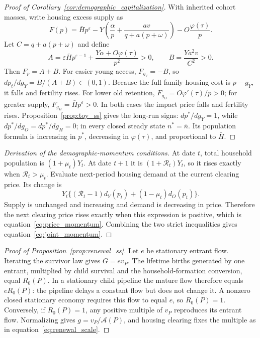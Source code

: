\documentclass[11pt]{article}
\theoremstyle{definition}
\newcommand{\1}{\mathbf 1}
\begin{document}
\begin{proof}[Proof of Corollary~\ref{cor:demographic_capitalization}]
With inherited cohort masses, write housing excess supply as
\[
 F(p)=\bar H p^\varepsilon
 -Y\left(\frac{\alpha}{p}+\frac{av}{q+a(p+\omega)}\right)
 -O\frac{\varphi(\tau)}{p}.
\]
Let $C=q+a(p+\omega)$ and define
\[
 A=\varepsilon\bar H p^{\varepsilon-1}
   +\frac{Y\alpha+O\varphi(\tau)}{p^2}>0,
 \qquad
 B=\frac{Ya^2v}{C^2}>0.
\]
Then $F_p=A+B$. For easier young access,
$F_{g_Y}=-B$, so $dp_t/dg_Y=B/(A+B)\in(0,1)$. Because the
full family-housing cost is $p-g_Y$, it falls and fertility rises. For lower
old retention, $F_{g_O}=O\varphi'(\tau)/p>0$; for greater supply,
$F_{g_H}=\bar H p^\varepsilon>0$. In both cases the impact price falls and
fertility rises. Proposition~\ref{prop:toy_ss} gives the long-run signs:
$dp^*/dg_Y=1$, while $dp^*/dg_O=dp^*/dg_H=0$; in every closed steady
state $n^*=\bar n$. Its population formula is increasing in $p^*$, decreasing
in $\varphi(\tau)$, and proportional to $\bar H$.
\end{proof}

\begin{proof}[Derivation of the demographic-momentum conditions]
At date $t$, total household population is $(1+\mu_t)Y_t$. At date $t+1$ it is
$(1+\mathcal R_t)Y_t$, so it rises exactly when $\mathcal R_t>\mu_t$. Evaluate next-period
housing demand at the current clearing price. Its change is
\[
 Y_t\{(\mathcal R_t-1)d_Y(p_t)+(1-\mu_t)d_O(p_t)\}.
\]
Supply is unchanged and increasing and demand is decreasing in price.
Therefore the next clearing price rises exactly when this expression is
positive, which is equation~\eqref{eq:price_momentum}. Combining the two strict
inequalities gives equation~\eqref{eq:joint_momentum}.
\end{proof}

\begin{proof}[Proof of Proposition~\ref{prop:renewal_ss}]
Let $e$ be stationary entrant flow. Iterating the survivor law gives
$G=e v_P$. The lifetime births generated by one entrant, multiplied by child
survival and the household-formation conversion, equal $R_0(P)$. In a
stationary child pipeline the mature flow therefore equals $eR_0(P)$: the
pipeline delays a constant flow but does not change it. A nonzero closed
stationary economy requires this flow to equal $e$, so $R_0(P)=1$.
Conversely, if $R_0(P)=1$, any positive multiple of $v_P$ reproduces its
entrant flow. Normalizing gives $g=v_P/\mathcal A(P)$, and housing
clearing fixes the multiple as in equation~\eqref{eq:renewal_scale}.
\end{proof}
\end{document}
